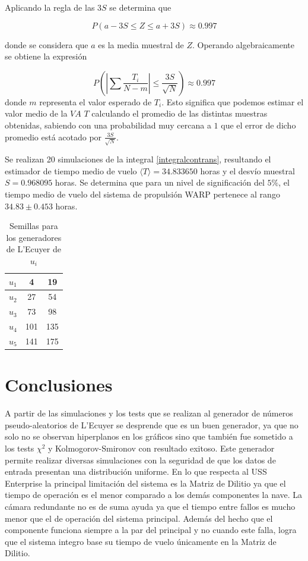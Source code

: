 \documentclass{sig-alternate}
\begin{document}
Aplicando la regla de las $3S$ se determina que 

\begin{equation}
P(a - 3S \le Z \le a + 3S)
\approx 0.997
\end{equation}

donde se considera que $a$ es la media muestral de $Z$. Operando
algebraicamente se obtiene la expresi\'{o}n 

\begin{equation}
\nonumber
P(|\sum \frac{T_{i}}{N-m}|\le \frac{3S}{\sqrt{N}}) \approx 0.997
\end{equation}
 donde $m$ representa el valor esperado
de $T_{i}$.
Esto significa que podemos estimar el valor medio de la $VA$ $T$ calculando
el promedio de las distintas muestras obtenidas, sabiendo con una probabilidad
muy cercana a $1$ que el error de dicho promedio est\'{a} acotado por 
$\frac{3S}{\sqrt{N}}$.

Se realizan 20 simulaciones  
de la integral \eqref{integralcontrans}, resultando el
estimador de tiempo medio de vuelo $\langle T \rangle = 34.833650$ horas y el desv\'io muestral
$S = 0.968095$ horas. Se determina que para un nivel de significaci\'on del $5\%$, el tiempo medio de vuelo
del sistema de propulsi\'on WARP pertenece al rango $ 34.83 \pm 0.453 $ horas.

\begin{table}[h]
\label{seeds}
\centering
\begin{tabular}{|c|c|c|}
\hline
 $u_1$ & 4 & 19 \\
\hline
 $u_2$ & 27 & 54 \\
\hline
 $u_3$ & 73 & 98 \\
\hline
$u_4$ & 101 & 135 \\
\hline
$u_5$ & 141 & 175 \\
\hline
\end{tabular}
\caption{Semillas para los generadores de L'Ecuyer de $u_i$}
\end{table}


\section{Conclusiones}\label{conclusiones}

A partir de las simulaciones y los tests que se realizan al generador de n\'{u}meros 
pseudo-aleatorios de L'Ecuyer se desprende que es un buen generador, ya que no solo no 
se observan hiperplanos en los gr\'{a}ficos sino que tambi\'{e}n fue sometido a
los tests $\chi^{2}$ y Kolmogorov-Smironov con resultado exitoso. Este generador
permite realizar diversas simulaciones con la seguridad de que los datos de
entrada presentan una distribuci\'{o}n uniforme.
En lo que respecta al USS Enterprise la principal limitaci\'on del sistema es la 
Matriz de Dilitio ya que el tiempo de operaci\'on es el menor comparado a los dem\'as
componentes la nave. La c\'amara redundante no es de suma ayuda ya que el tiempo 
entre fallos es mucho menor que el de operaci\'on del sistema principal. Adem\'as 
del hecho que el componente funciona siempre a la par del principal y no 
cuando este falla, logra que el sistema integro base su tiempo de vuelo \'unicamente 
en la Matriz de Dilitio.
\end{document}
